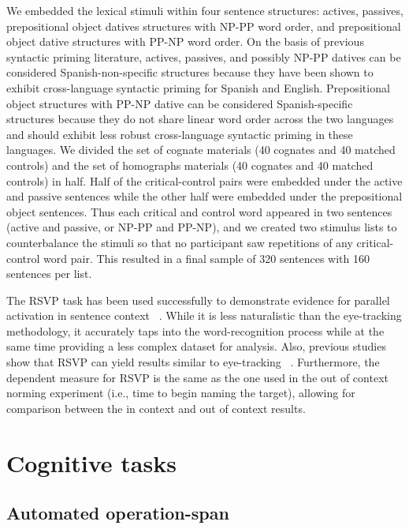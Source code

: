 We embedded the lexical stimuli within four sentence structures: actives, passives, prepositional object datives structures with NP-PP word order, and prepositional object dative structures with PP-NP word order. On the basis of previous syntactic priming literature, actives, passives, and possibly NP-PP datives can be considered Spanish-non-specific structures because they have been shown to exhibit cross-language syntactic priming for Spanish and English. Prepositional object structures with PP-NP dative can be considered Spanish-specific structures because they do not share linear word order across the two languages and should exhibit less robust cross-language syntactic priming in these languages. We divided the set of cognate materials (40 cognates and 40 matched controls) and the set of homographs materials (40 cognates and 40 matched controls) in half. Half of the critical-control pairs were embedded under the active and passive sentences while the other half were embedded under the prepositional object sentences. Thus each critical and control word appeared in two sentences (active and passive, or NP-PP and PP-NP), and we created two stimulus lists to counterbalance the stimuli so that no participant saw repetitions of any critical-control word pair. This resulted in a final sample of 320 sentences with 160 sentences per list.

The RSVP task has been used successfully to demonstrate evidence for parallel activation in sentence context ~\citep[e.g.,][]{Schwartz2006}. While it is less naturalistic than the eye-tracking methodology, it accurately taps into the word-recognition process while at the same time providing a less complex dataset for analysis. Also, previous studies show that RSVP can yield results similar to eye-tracking ~\citep{Altarriba1996}. Furthermore, the dependent measure for RSVP is the same as the one used in the out of context norming experiment (i.e., time to begin naming the target), allowing for comparison between the in context and out of context results.

\section{Cognitive tasks}
\label{cognitivetasks}

\subsection{Automated operation-span}
\label{automatedoperation-span}

